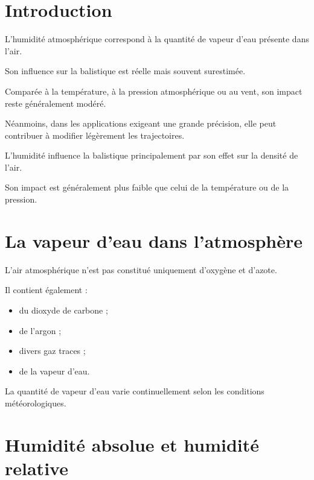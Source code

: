
\section{Introduction}

L'humidité atmosphérique correspond à la quantité de vapeur d'eau présente
dans l'air.

Son influence sur la balistique est réelle mais souvent surestimée.

Comparée à la température, à la pression atmosphérique ou au vent, son impact
reste généralement modéré.

Néanmoins, dans les applications exigeant une grande précision, elle peut
contribuer à modifier légèrement les trajectoires.

\begin{aretenir}

L'humidité influence la balistique principalement par son effet sur la
densité de l'air.

Son impact est généralement plus faible que celui de la température ou de la
pression.

\end{aretenir}

\section{La vapeur d'eau dans l'atmosphère}

L'air atmosphérique n'est pas constitué uniquement d'oxygène et d'azote.

Il contient également :

\begin{itemize}
\item du dioxyde de carbone ;
\item de l'argon ;
\item divers gaz traces ;
\item de la vapeur d'eau.
\end{itemize}

La quantité de vapeur d'eau varie continuellement selon les conditions
météorologiques.

\section{Humidité absolue et humidité relative}

